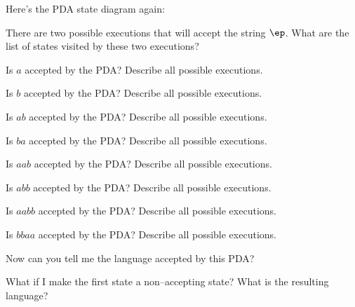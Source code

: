 Here's the PDA state diagram again:

\begin{center}
\end{center}

\begin{tightlist}
\item There are two possible executions that will accept the string $\ep$.
What are the list of states visited by these two executions?
\item Is $a$ accepted by the PDA? Describe all possible executions.
\item Is $b$ accepted by the PDA? Describe all possible executions.
\item Is $ab$ accepted by the PDA? Describe all possible executions.
\item Is $ba$ accepted by the PDA? Describe all possible executions.
\item Is $aab$ accepted by the PDA? Describe all possible executions.
\item Is $abb$ accepted by the PDA? Describe all possible executions.
\item Is $aabb$ accepted by the PDA? Describe all possible executions.
\item Is $bbaa$ accepted by the PDA? Describe all possible executions.
\item Now can you tell me the language accepted by this PDA?
\item What if I make the first state a non--accepting state? What is the 
resulting language?
\end{tightlist}
